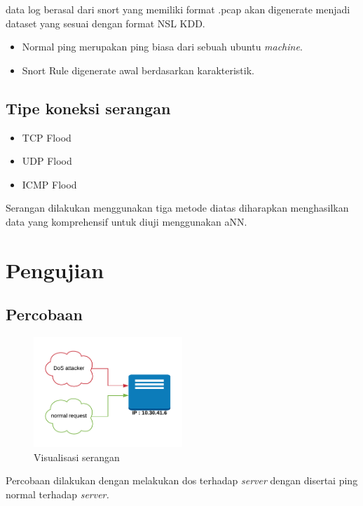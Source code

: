 data log berasal dari snort yang memiliki format .pcap akan digenerate menjadi dataset yang sesuai dengan format NSL KDD.

\begin{itemize}
	\item Normal ping merupakan ping biasa dari sebuah ubuntu \textit{machine}.
	\item Snort Rule digenerate awal berdasarkan karakteristik.
\end{itemize}

\subsection{Tipe koneksi serangan}
\begin{itemize}
    \item TCP Flood
    \item UDP Flood
    \item ICMP Flood
\end{itemize}

Serangan dilakukan menggunakan tiga metode diatas diharapkan menghasilkan data yang komprehensif untuk diuji menggunakan aNN.

\section{Pengujian}


\subsection{Percobaan}

\begin{figure}[H]
\centering
\includegraphics[width=0.5\textwidth]{skenario}
\caption{Visualisasi serangan}
\label{fig:figure2}
\end{figure}

Percobaan dilakukan dengan melakukan dos terhadap \textit{server} dengan disertai ping normal terhadap \textit{server.}


